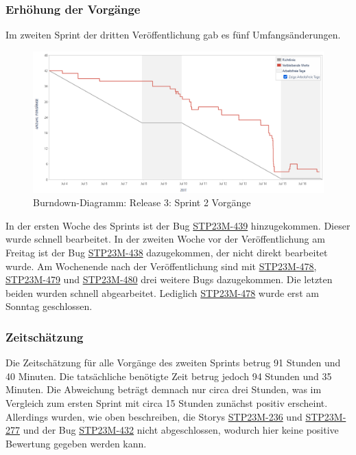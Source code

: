 \subsubsection{Erhöhung der Vorgänge}
Im zweiten Sprint der dritten Veröffentlichung gab es fünf Umfangsänderungen.
\begin{figure}[H]
    \center
    \includegraphics[height=0.5\textwidth]{images/burndown/sprint2vorg.png}
    \caption{Burndown-Diagramm: Release 3: Sprint 2 Vorgänge}
    \label{fig: sprint2vorg}
\end{figure}

In der ersten Woche des Sprints ist der Bug \hyperlink{S439}{STP23M-439} hinzugekommen. Dieser wurde schnell bearbeitet. In der zweiten Woche vor der Veröffentlichung am Freitag ist der Bug \hyperlink{S438}{STP23M-438} dazugekommen, der nicht direkt bearbeitet wurde. Am Wochenende nach der Veröffentlichung sind mit \hyperlink{S478}{STP23M-478}, \hyperlink{S479}{STP23M-479} und \hyperlink{S480}{STP23M-480} drei weitere Bugs dazugekommen. Die letzten beiden wurden schnell abgearbeitet. Lediglich \hyperlink{S478}{STP23M-478} wurde erst am Sonntag geschlossen.

\subsubsection{Zeitschätzung}
Die Zeitschätzung für alle Vorgänge des zweiten Sprints betrug 91 Stunden und 40 Minuten. Die tatsächliche benötigte Zeit betrug jedoch 94 Stunden und 35 Minuten. Die Abweichung beträgt demnach nur circa drei Stunden, was im Vergleich zum ersten Sprint mit circa 15 Stunden zunächst positiv erscheint. Allerdings wurden, wie oben beschreiben, die Storys \hyperlink{S236}{STP23M-236} und \hyperlink{S277}{STP23M-277} und der Bug \hyperlink{S432}{STP23M-432} nicht abgeschlossen, wodurch hier keine positive Bewertung gegeben werden kann. 